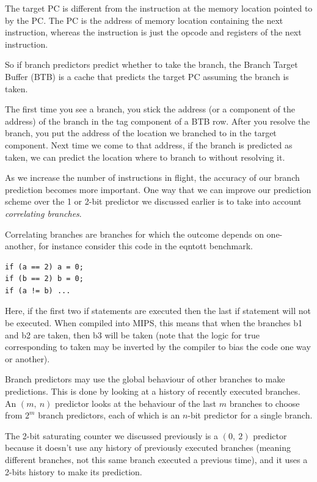 \documentclass{article}
\begin{document}
The target PC is different from the instruction at the memory location pointed to by the PC. The PC is the address of memory location containing the next instruction, whereas the instruction is just the opcode and registers of the next instruction.

So if branch predictors predict whether to take the branch, the Branch Target Buffer (BTB) is a cache that predicts the target PC assuming the branch is taken.

The first time you see a branch, you stick the address (or a component of the address) of the branch in the tag component of a BTB row. After you resolve the branch, you put the address of the location we branched to in the target component. Next time we come to that address, if the branch is predicted as taken, we can predict the location where to branch to without resolving it. 

As we increase the number of instructions in flight, the accuracy of our branch prediction becomes more important. One way that we can improve our prediction scheme over the 1 or 2-bit predictor we discussed earlier is to take into account \textit{correlating branches}. 

Correlating branches are branches for which the outcome depends on one-another, for instance consider this code in the eqntott benchmark. 

\begin{verbatim}
if (a == 2) a = 0;
if (b == 2) b = 0;
if (a != b) ...
\end{verbatim}

Here, if the first two if statements are executed then the last if statement will not be executed. When compiled into MIPS, this means that when the branches b1 and b2 are taken, then b3 will be taken (note that the logic for true corresponding to taken may be inverted by the compiler to bias the code one way or another). 

Branch predictors may use the global behaviour of other branches to make predictions. This is done by looking at a history of recently executed branches. An $(m,\ n)$ predictor looks at the behaviour of the last $m$ branches to choose from $2^m$ branch predictors, each of which is an $n$-bit predictor for a single branch. 

The 2-bit saturating counter we discussed previously is a $(0,\ 2)$ predictor because it doesn't use any history of previously executed branches (meaning different branches, not this same branch executed a previous time), and it uses a 2-bits history to make its prediction.
\end{document}
